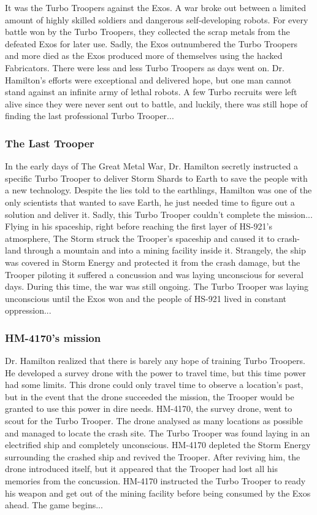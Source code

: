 \documentclass[12pt]{article}
\begin{document}
It was the Turbo Troopers against the Exos. A war broke out between a limited amount of highly skilled soldiers and dangerous self-developing robots. For every battle won by the Turbo Troopers, they collected the scrap metals from the defeated Exos for later use. Sadly, the Exos outnumbered the Turbo Troopers and more died as the Exos produced more of themselves using the hacked Fabricators. There were less and less Turbo Troopers as days went on. Dr. Hamilton's efforts were exceptional and delivered hope, but one man cannot stand against an infinite army of lethal robots. A few Turbo recruits were left alive since they were never sent out to battle, and luckily, there was still hope of finding the last professional Turbo Trooper...

\subsubsection{The Last Trooper}

In the early days of The Great Metal War, Dr. Hamilton secretly instructed a specific Turbo Trooper to deliver Storm Shards to Earth to save the people with a new technology. Despite the lies told to the earthlings, Hamilton was one of the only scientists that wanted to save Earth, he just needed time to figure out a solution and deliver it. Sadly, this Turbo Trooper couldn't complete the mission... Flying in his spaceship, right before reaching the first layer of HS-921's atmosphere, The Storm struck the Trooper's spaceship and caused it to crash-land through a mountain and into a mining facility inside it. Strangely, the ship was covered in Storm Energy and protected it from the crash damage, but the Trooper piloting it suffered a concussion and was laying unconscious for several days. During this time, the war was still ongoing. The Turbo Trooper was laying unconscious until the Exos won and the people of HS-921 lived in constant oppression...

\subsubsection{HM-4170's mission}

Dr. Hamilton realized that there is barely any hope of training Turbo Troopers. He developed a survey drone with the power to travel time, but this time power had some limits. This drone could only travel time to observe a location's past, but in the event that the drone succeeded the mission, the Trooper would be granted to use this power in dire needs. HM-4170, the survey drone, went to scout for the Turbo Trooper. The drone analysed as many locations as possible and managed to locate the crash site. The Turbo Trooper was found laying in an electrified ship and completely unconscious. HM-4170 depleted the Storm Energy surrounding the crashed ship and revived the Trooper. After reviving him, the drone introduced itself, but it appeared that the Trooper had lost all his memories from the concussion. HM-4170 instructed the Turbo Trooper to ready his weapon and get out of the mining facility before being consumed by the Exos ahead. The game begins... 
\end{document}
